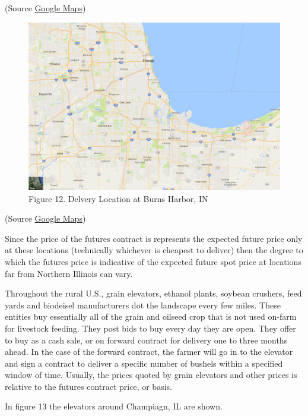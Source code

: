 \documentclass[]{book}
\theoremstyle{definition}
\theoremstyle{definition}
\theoremstyle{remark}
\begin{document}
(Source \href{https://www.google.com/maps}{Google Maps})

\begin{figure}[htbp]
\centering
\includegraphics{images/Burns-Harbor.png}
\caption{Figure 12. Delvery Location at Burns Harbor, IN}
\end{figure}

(Source
\href{https://www.google.com/maps/place/Burns+Harbor,+IN/@41.740398,-87.7248706,10.5z/data=!4m5!3m4!1s0x8811bc3712ab828d:0x98301a46014d10b5!8m2!3d41.6258708!4d-87.1333676}{Google
Maps})

Since the price of the futures contract is represents the expected
future price only at these locations (technically whichever is cheapest
to deliver) then the degree to which the futures price is indicative of
the expected future spot price at locations far from Northern Illinois
can vary.

Throughout the rural U.S., grain elevators, ethanol plants, soybean
crushers, feed yards and biodeisel manufacturers dot the landscape every
few miles. These entities buy essentially all of the grain and oilseed
crop that is not used on-farm for livestock feeding. They post bids to
buy every day they are open. They offer to buy as a cash sale, or on
forward contract for delivery one to three months ahead. In the case of
the forward contract, the farmer will go in to the elevator and sign a
contract to deliver a specific number of bushels within a specified
window of time. Usually, the prices quoted by grain elevators and other
prices is relative to the futures contract price, or basis.

In figure 13 the elevators around Champiagn, IL are shown.
\end{document}
